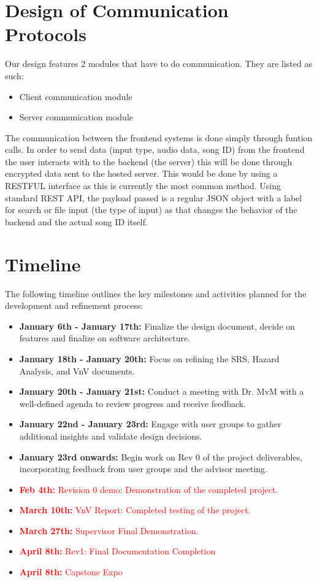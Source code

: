\documentclass[12pt, titlepage]{article}
\begin{document}
\section{Design of Communication Protocols}
Our design features 2 modules that have to do communication. They are listed as such: 
\begin{itemize}
  \item Client communication module
  \item Server communication module
\end{itemize}
The communication between the frontend systems is done simply through funtion calls. In order to send data (input type, audio data, song ID) from the frontend the user 
interacts with to the backend (the server) this will be done through encrypted data sent to the hosted server. This would be done by using
a RESTFUL interface as this is currently the most common method. Using standard REST API, the payload passed is a regular JSON object with 
a label for search or file input (the type of input) as that changes the behavior of the backend and the actual song ID itself. 

\section{Timeline}

The following timeline outlines the key milestones and activities planned for the development and refinement process:

\begin{itemize}
    \item \textbf{January 6th - January 17th:} Finalize the design document, decide on features and finalize on software architecture.
    \item \textbf{January 18th - January 20th:} Focus on refining the SRS, Hazard Analysis, and VnV documents.
    \item \textbf{January 20th - January 21st:} Conduct a meeting with Dr. MvM with a well-defined agenda to review progress and receive feedback.
    \item \textbf{January 22nd - January 23rd:} Engage with user groups to gather additional insights and validate design decisions.
    \item \textbf{January 23rd onwards:} Begin work on Rev 0 of the project deliverables, incorporating feedback from user groups and the advisor meeting.
    \item \textcolor{red}{\textbf{Feb 4th:} Revision 0 demo: Demonstration of the completed project.}
    \item \textcolor{red}{\textbf{March 10th:} VnV Report: Completed testing of the project.}
    \item \textcolor{red}{\textbf{March 27th:} Supervisor Final Demonstration.}
    \item \textcolor{red}{\textbf{April 8th:} Rev1: Final Documentation Completion}
    \item \textcolor{red}{\textbf{April 8th:} Capstone Expo}
\end{itemize}
\end{document}

